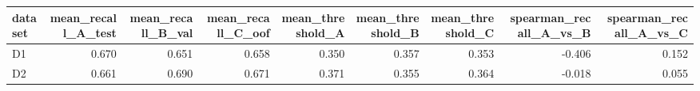 \begin{tabular}{lrrrrrrrr}
\toprule
dataset & mean\_recall\_A\_test & mean\_recall\_B\_val & mean\_recall\_C\_oof & mean\_threshold\_A & mean\_threshold\_B & mean\_threshold\_C & spearman\_recall\_A\_vs\_B & spearman\_recall\_A\_vs\_C \\
\midrule
D1 & 0.670 & 0.651 & 0.658 & 0.350 & 0.357 & 0.353 & -0.406 & 0.152 \\
D2 & 0.661 & 0.690 & 0.671 & 0.371 & 0.355 & 0.364 & -0.018 & 0.055 \\
\bottomrule
\end{tabular}
